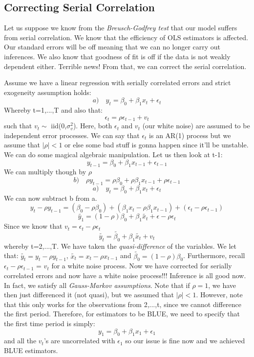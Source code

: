 \documentclass[11pt, oneside]{article}
\theoremstyle{definition}
\begin{document}
\subsection{Correcting Serial Correlation}
Let us suppose we know from the \textit{Breusch-Godfrey test} that our model suffers from serial correlation. We know that the efficiency of OLS estimators is affected. Our standard errors will be off meaning that we can no longer carry out inferences. We also know that goodness of fit is off if the data is not weakly dependent either. Terrible news! From that, we can correct the serial correlation.

Assume we have a linear regression with serially correlated errors and strict exogeneity assumption holds:
$$
a) \quad y_t = \beta_0 + \beta_1 x_t + \epsilon_t
$$
Whereby t=1,...,T and also that:
$$
\epsilon_t = \rho \epsilon_{t-1} + v_t
$$
such that $v_t \sim$ iid(0,$\sigma_v^2$). Here, both $\epsilon_t$ and $v_t$ (our white noise) are assumed to be independent error processes. We can say that $\epsilon_t$ is an AR(1) process but we assume that $|\rho| < 1$ or else some bad stuff is gonna happen since it'll be unstable. We can do some magical algebraic manipulation. Let us then look at t-1:
$$
y_{t-1} = \beta_0 + \beta_1 x_{t-1} + \epsilon_{t-1}
$$
We can multiply though by $\rho$
$$
b) \quad \rho y_{t-1} = \rho \beta_0 + \rho \beta_1 x_{t-1} + \rho \epsilon_{t-1}
$$
$$
a) \quad y_t = \beta_0 + \beta_1 x_t + \epsilon_t
$$
We can now subtract b from a.
$$
y_t - \rho y_{t-1} = (\beta_0 - \rho \beta_0) + (\beta_1 x_t - \rho \beta_1 x_{t-1}) + (\epsilon_t - \rho \epsilon_{t-1})
$$
$$
\tilde{y_1} = (1 - \rho)\beta_0 + \beta_1\tilde{x_t} + \epsilon - \rho\epsilon_t
$$
Since we know that $v_t = \epsilon_t - \rho\epsilon_t$
$$
\tilde{y_t} = \tilde{\beta_0} + \beta_1 \tilde{x_t} + v_t
$$
whereby t=2,...,T. We have taken the \textit{quasi-difference} of the variables. We let that: $\tilde{y_t} = y_t - \rho y_{t-1}$, $\tilde{x_t} = x_t - \rho x_{t-1}$ and $\tilde{\beta_0} = (1 - \rho)\beta_0$. Furthermore, recall $\epsilon_t - \rho \epsilon_{t-1}$ = $v_t$ for a white noise process. Now we have corrected for serially correlated errors and now have a white noise process!!! Inference is all good now. In fact, we satisfy all \textit{Gauss-Markov assumptions}. Note that if $\rho = 1$, we have then just differenced it (not quasi), but we assumed that $|\rho| < 1$. However, note that this only works for the observations from 2,...,t, since we cannot difference the first period. Therefore, for estimators to be BLUE, we need to specify that the first time period is simply:
$$
y_1 = \beta_0 + \beta_1x_1 + \epsilon_1
$$
and all the $v_t$'s are uncorrelated with $\epsilon_1$ so our issue is fine now and we achieved BLUE estimators.
\end{document}
